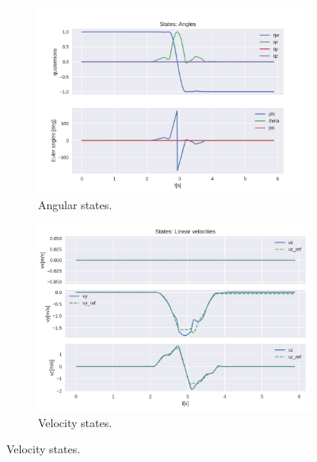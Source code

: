 \documentclass{thesisreport}
\begin{document}
\begin{figure}[H]
\medskip
	\begin{subfigure}{0.45\textwidth}
		\includegraphics[width=\linewidth]{Images/acados_simulations/flip_trajectory/3D_quadrotor/angleStates.png}
		\caption{Angular states.} \label{fig:3D_flip_sim_angles}
	\end{subfigure}\hspace*{\fill}
	\begin{subfigure}{0.45\textwidth}
		\includegraphics[width=\linewidth]{Images/acados_simulations/flip_trajectory/3D_quadrotor/velStates.png}
		\caption{Velocity states.} \label{fig:3D_flip_sim_velocities}
	\end{subfigure}


\end{figure}
\end{document}
